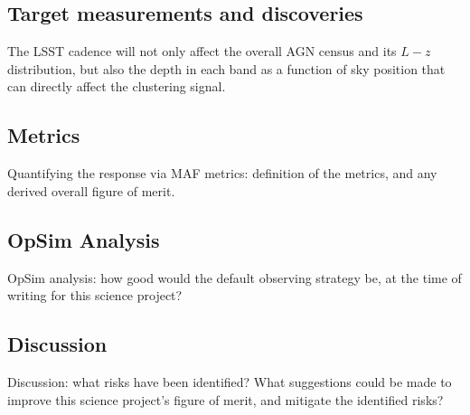 \subsection{Target measurements and discoveries}
\label{sec:\secname:targets}




The LSST cadence will not only affect the overall AGN census and its
$L-z$ distribution, but also the depth in each band as a function of
sky position that can directly affect the clustering signal.



\subsection{Metrics}
\label{sec:\secname:metrics}

Quantifying the response via MAF metrics: definition of the metrics,
and any derived overall figure of merit.



\subsection{OpSim Analysis}
\label{sec:\secname:analysis}

OpSim analysis: how good would the default observing strategy be, at
the time of writing for this science project?



\subsection{Discussion}
\label{sec:\secname:discussion}

Discussion: what risks have been identified? What suggestions could be
made to improve this science project's figure of merit, and mitigate
the identified risks?



\navigationbar
